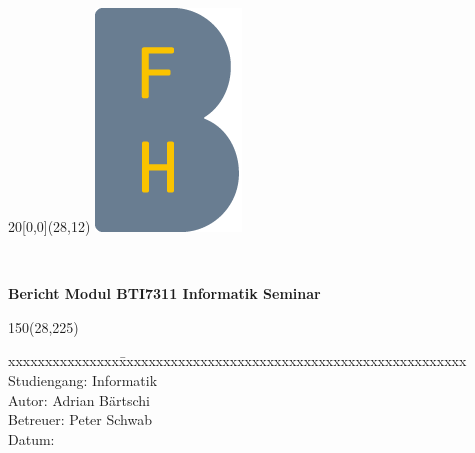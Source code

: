 %
%

\begin{titlepage}


\setlength{\unitlength}{1mm}
\begin{textblock}{20}[0,0](28,12)
	\includegraphics[scale=1.0]{bilder/BFH_Logo_B.png}
\end{textblock}
\color{black}

\begin{flushleft}

\vspace*{21mm}

\fontsize{26pt}{40pt}\selectfont 
\titel 				\\							%
\vspace{2mm}

\fontsize{16pt}{24pt}\selectfont\vspace{0.3em}
\vspace{5mm}

\fontsize{10pt}{12pt}\selectfont
\textbf{Bericht Modul BTI7311 Informatik Seminar} \\									%
\vspace{7mm}


\begin{textblock}{150}(28,225)
\fontsize{10pt}{17pt}\selectfont
\begin{tabbing}
xxxxxxxxxxxxxxx\=xxxxxxxxxxxxxxxxxxxxxxxxxxxxxxxxxxxxxxxxxxxxxxx \kill
Studiengang:	\> Informatik	\\			%
Autor:			\> Adrian Bärtschi		\\					%
Betreuer:		\> Peter Schwab		\\					%
Datum:			\> \versiondate					\\		%
\end{tabbing}


\end{textblock}
\end{flushleft}
\end{titlepage}
